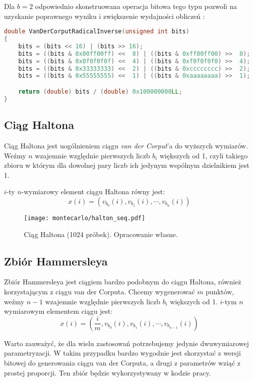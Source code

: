 \documentclass[../main.tex]{subfiles}
\begin{document}
Dla $b=2$ odpowiednio skonstruowana operacja bitowa tego typu pozwoli na
uzyskanie poprawnego wyniku i zwiększenie wydajności obliczeń
\cite{dammertz_2012,MultidimensionalSampling}:

\begin{lstlisting}[language=c++]
double VanDerCorputRadicalInverse(unsigned int bits)
{
	bits = (bits << 16) | (bits >> 16);
	bits = ((bits & 0x00ff00ff) <<  8) | ((bits & 0xff00ff00) >>  8);
	bits = ((bits & 0x0f0f0f0f) <<  4) | ((bits & 0xf0f0f0f0) >>  4);
	bits = ((bits & 0x33333333) <<  2) | ((bits & 0xcccccccc) >>  2);
	bits = ((bits & 0x55555555) <<  1) | ((bits & 0xaaaaaaaa) >>  1);

	return (double) bits / (double) 0x100000000LL;
}
\end{lstlisting}

\subsection{Ciąg Haltona}

Ciąg Haltona jest uogólnieniem ciągu \textit{van der Corput}'a do wyższych
wymiarów. Weźmy $n$ wzajemnie względnie pierwszych liczb $b_i$ większych od 1,
czyli takiego zbioru w którym dla dowolnej pary liczb ich jedynym wspólnym
dzielnikiem jest 1.

$i$-ty $n$-wymiarowy element ciągu Haltona równy jest:
\[ 
x(i) = \left( v_{b_0}(i), v_{b_1}(i), \cdots, v_{b_n}(i) \right) 
\]

\begin{figure}[h]
  \centering
  \texttt{[image: montecarlo/halton\_seq.pdf]}
  \caption{Ciąg Haltona (1024 próbek). Opracowanie własne.}
  \label{fig:HaltonSamples}
\end{figure}

\subsection{Zbiór Hammersleya}

Zbiór Hammersleya jest ciągiem bardzo podobnym do ciągu Haltona, również
korzystającym z ciągu van der Corputa. Chcemy wygenerować $m$ punktów, weźmy
$n-1$ wzajemnie względnie pierwszych liczb $b_i$ większych od 1. $i$-tym $n$
wymiarowym elementem ciągu jest:
\[
  x(i) = \left(
    \frac{i}{m}, v_{b_0}(i), v_{b_1}(i), \cdots, v_{b_{n-1}}(i)
  \right)
\]

Warto zauważyć, że dla wielu zastosowań potrzebujemy jedynie dwuwymiarowej
parametryzacji. W takim przypadku bardzo wygodnie jest skorzystać z wersji
bitowej do generowania ciągu van der Corputa, a drugi z parametrów wziąć z
prostej proporcji. Ten zbiór będzie wykorzystywany w kodzie pracy.
\end{document}
